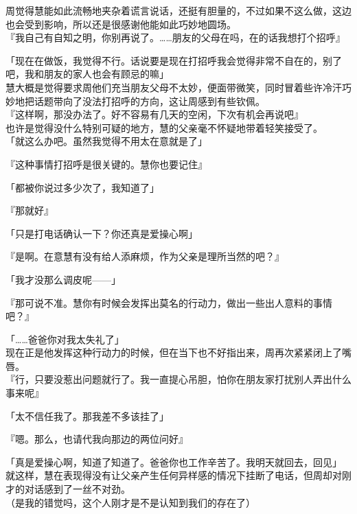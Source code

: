 周觉得慧能如此流畅地夹杂着谎言说话，还挺有胆量的，不过如果不这么做，这边也会受到影响，所以还是很感谢他能如此巧妙地圆场。\\

『我自己有自知之明，你别再说了。……朋友的父母在吗，在的话我想打个招呼』

「现在在做饭，我觉得不行。话说要是现在打招呼我会觉得非常不自在的，别了吧，我和朋友的家人也会有顾忌的嘛」\\

慧大概是觉得要求周他们充当朋友父母不太妙，便面带微笑，同时冒着些许冷汗巧妙地把话题带向了没法打招呼的方向，这让周感到有些钦佩。\\

『这样啊，那没办法了。好不容易有几天的空闲，下次有机会再说吧』\\

也许是觉得没什么特别可疑的地方，慧的父亲毫不怀疑地带着轻笑接受了。\\

「就这么办吧。虽然我觉得不用太在意就是了」

『这种事情打招呼是很关键的。慧你也要记住』

「都被你说过多少次了，我知道了」

『那就好』

「只是打电话确认一下？你还真是爱操心啊」

『是啊。在意慧有没有给人添麻烦，作为父亲是理所当然的吧？』

「我才没那么调皮呢——」

『那可说不准。慧你有时候会发挥出莫名的行动力，做出一些出人意料的事情吧？』

「……爸爸你对我太失礼了」\\

现在正是他发挥这种行动力的时候，但在当下也不好指出来，周再次紧紧闭上了嘴唇。\\

『行，只要没惹出问题就行了。我一直提心吊胆，怕你在朋友家打扰别人弄出什么事来呢』

「太不信任我了。那我差不多该挂了」

『嗯。那么，也请代我向那边的两位问好』

「真是爱操心啊，知道了知道了。爸爸你也工作辛苦了。我明天就回去，回见」\\

就这样，慧在表现得没有让父亲产生任何异样感的情况下挂断了电话，但周却对刚才的对话感到了一丝不对劲。\\

（是我的错觉吗，这个人刚才是不是认知到我们的存在了）\\

